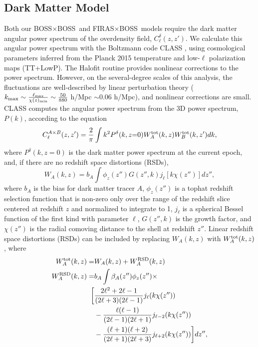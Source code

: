 \documentclass[fleqn,usenatbib]{mnras}
\newcommand{\BB}{BOSS${\times}$BOSS}
\newcommand{\FB}{FIRAS${\times}$BOSS}
\begin{document}
\subsection{Dark Matter Model}\label{subsec:dark_matter_model}
Both our \BB\ and \FB\ models require the dark matter angular power spectrum of the overdensity field, $C_{\ell}^{\delta}(z,z')$. We calculate this angular power spectrum with the Boltzmann code CLASS \citep{2013JCAP...11..044D, 2014JCAP...01..042D}, using cosmological parameters inferred from the Planck 2015 \citep{Ade:2015xua} temperature and low-$\ell$ polarization maps (TT+LowP). The Halofit routine \citep{Smith:2002dz} provides nonlinear corrections to the power spectrum. 
However, on the several-degree scales of this analysis, the fluctuations are well-described by linear perturbation theory ($k_{\rm max} \sim \frac{\ell_{\rm max}}{\chi(z)_{\rm min}} \sim \frac{50}{880}$ h/Mpc $\sim 0.06$ h/Mpc), and nonlinear corrections are small. 
CLASS computes the angular power spectrum from the 3D power spectrum, $P(k)$, according to the equation
\begin{equation}
C_{\ell}^{A\times B}(z,z') = \frac{2}{\pi} \int k^2 P^{\delta}(k,z{=}0) W_A^{\rm tot}(k,z)W_B^{\rm tot}(k,z') dk,
\end{equation}
where $P^{\delta}(k,z{=}0)$ is the dark matter power spectrum at the current epoch, and, if there are no redshift space distortions (RSDs),
\begin{equation}
W_A(k, z) = b_A \int \phi_z(z'') G(z'',k) j_{\ell}[k \chi (z'')] dz'',
\end{equation}
where $b_A$ is the bias for dark matter tracer $A$, $\phi_z(z'')$ is a tophat redshift selection function that is non-zero only over the range of the redshift slice centered at redshift $z$ and normalized to integrate to 1, $ j_{\ell}$ is a spherical Bessel function of the first kind with parameter $\ell$, $G(z'',k)$ is the growth factor, and $\chi(z'')$ is the radial comoving distance to the shell at redshift $z''$. Linear redshift space distortions (RSDs) can be included \citep{Fisher:1993pz, padmanabhan2007clustering} by replacing $W_A(k, z)$ with $W_A^{\rm tot}(k,z)$, where
\begin{equation}
\begin{split}\label{eq:RSD_boss}
W_A^{\rm tot}(k, z) = &W_A(k, z) + W_A^{\rm RSD}(k,z)\\
W_A^{\rm RSD}(k,z) =&b_A \int  \beta_A(z'') \phi_z(z'')  \times \\
\biggl [ &\frac{2\ell^2+2\ell -1}{(2\ell+3)(2\ell-1)}j_{\ell}(k \chi (z''))\\ 
&- \frac{\ell(\ell-1)}{(2\ell-1)(2\ell+1)}j_{\ell-2}(k \chi(z''))\\ 
&- \frac{(\ell+1)(\ell+2)}{(2\ell+1)(2\ell+3)}j_{\ell+2 }(k \chi(z'')) \biggr ] dz'',\\
\end{split}
\end{equation}
\end{document}

